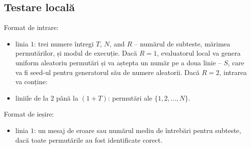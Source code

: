 \documentclass[12pt]{article}
\begin{document}
\subsection{Testare locală}
Format de intrare:
\begin{itemize}
	\item linia $1$: trei numere întregi $T$, $N$, and $R$ -- numărul de subteste, mărimea permutărilor, și modul de execuție. Dacă $R = 1$, evaluatorul local va genera uniform aleatoriu permutări și va aștepta un număr pe a doua linie -- $S$, care va fi seed-ul pentru generatorul său de numere aleatorii. Dacă $R = 2$, intrarea va conține:
	\item liniile de la $2$ până la $(1+T)$: permutări ale $\{1,2,\dots,N\}$.
\end{itemize}


Format de ieșire:
\begin{itemize}
	\item linia $1$: un mesaj de eroare sau numărul mediu de întrebări pentru subteste, dacă toate permutările au fost identificate corect.
\end{itemize}
\end{document}
